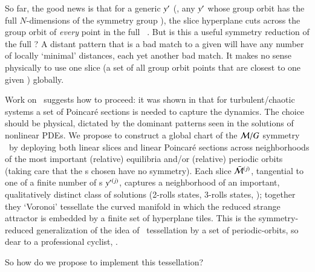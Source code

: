 


So far, the good news is that for a generic {\template} ${y'}$ (\ie,
any ${y'}$ whose group orbit has the full $N$-dimensions of the
symmetry group \Group), the slice hyperplane  cuts across
the group orbit of {\em every} point in the full \statesp\ \pS. But is
this a useful symmetry reduction of the full \statesp? A distant pattern
that is a bad match to a given {\template} will have any number of
locally `minimal' distances, each yet another bad match. It makes no
sense physically to use one slice (a set of all group orbit points that
are closest to one given {\template}) globally.

Work on \KS\ suggests how to proceed: it was shown in
 that for turbulent/chaotic systems a set of
Poincar\'e sections is needed to capture the dynamics. The choice should
be physical, dictated by the dominant patterns seen in the solutions of
nonlinear PDEs. We propose to construct a global chart of the
${\cal M}/G$ symmetry \reducedsp\ by deploying both linear slices and
linear Poincar\'e sections across neighborhoods of the most important
(relative) equilibria and/or (relative) periodic orbits (taking care that
the {\template s} chosen have no symmetry). Each slice $\bar{\cal M}{}^{(j)}$,
tangential to one of a finite number of {\template s}  ${y'}{}^{(j)}$,
captures a neighborhood of an important, qualitatively distinct class of
solutions (2-rolls states, 3-rolls states, \etc); together they `Voronoi'
tessellate  the curved manifold in which the reduced strange attractor is
embedded by a finite set of hyperplane tiles. This is the
symmetry-reduced generalization of the idea of {\statesp\ tessellation}
by a set of periodic-orbits, so dear to a professional cyclist,
.

So how do we propose to implement this tessellation?

